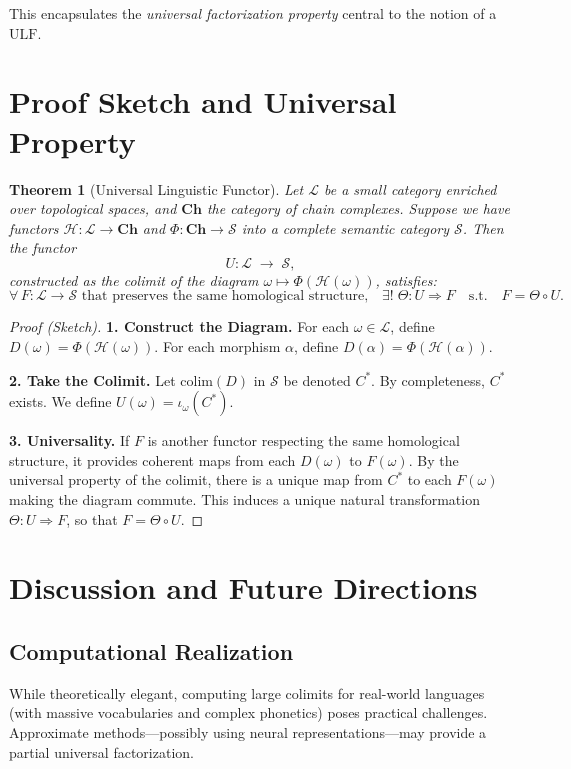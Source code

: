 \documentclass[11pt]{article}
\newtheorem{theorem}{Theorem}[section]
\theoremstyle{definition}
\theoremstyle{remark}
\begin{document}
\noindent
This encapsulates the \emph{universal factorization property} central to the notion of a \(\mathrm{ULF}\).

\section{Proof Sketch and Universal Property}
\label{sec:proof_sketch}

\begin{theorem}[Universal Linguistic Functor]
\label{thm:ulf}
Let \(\mathcal{L}\) be a small category enriched over topological spaces, and \(\mathbf{Ch}\) the category of chain complexes. Suppose we have functors \(\mathcal{H}:\mathcal{L}\to \mathbf{Ch}\) and \(\Phi: \mathbf{Ch}\to \mathcal{S}\) into a complete semantic category \(\mathcal{S}\). Then the functor
\[
U: \mathcal{L}\;\longrightarrow\;\mathcal{S},
\]
constructed as the colimit of the diagram \(\omega \mapsto \Phi(\mathcal{H}(\omega))\), satisfies:
\[
\forall\,F: \mathcal{L}\to \mathcal{S} \text{ that preserves the same homological structure,}
\quad
\exists!\;\Theta:U \Rightarrow F
\quad\text{s.t.}\quad
F = \Theta\circ U.
\]
\end{theorem}

\begin{proof}[Proof (Sketch)]
\textbf{1. Construct the Diagram.}  
For each \(\omega\in\mathcal{L}\), define \(D(\omega) = \Phi(\mathcal{H}(\omega))\). For each morphism \(\alpha\), define \(D(\alpha) = \Phi(\mathcal{H}(\alpha))\).  

\textbf{2. Take the Colimit.}  
Let \(\mathrm{colim}(D)\) in \(\mathcal{S}\) be denoted \(C^*\). By completeness, \(C^*\) exists. We define \(U(\omega) = \iota_\omega(C^*)\).  

\textbf{3. Universality.}  
If \(F\) is another functor respecting the same homological structure, it provides coherent maps from each \(D(\omega)\) to \(F(\omega)\). By the universal property of the colimit, there is a unique map from \(C^*\) to each \(F(\omega)\) making the diagram commute. This induces a unique natural transformation \(\Theta : U \Rightarrow F\), so that \(F = \Theta \circ U\).  
\end{proof}

\section{Discussion and Future Directions}
\label{sec:discussion}

\subsection{Computational Realization}
While theoretically elegant, computing large colimits for real-world languages (with massive vocabularies and complex phonetics) poses practical challenges. Approximate methods—possibly using neural representations—may provide a partial universal factorization.
\end{document}
